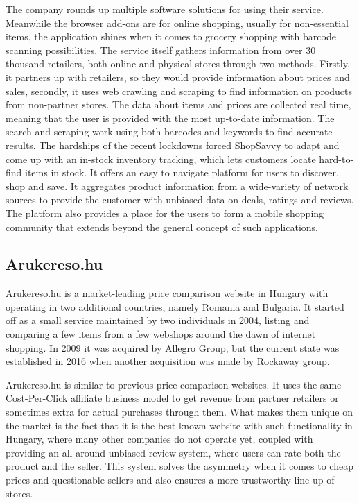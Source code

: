 The company rounds up multiple software solutions for using their service. Meanwhile the browser add-ons are for online shopping, usually for non-essential items, the application shines when it comes to grocery shopping with barcode scanning possibilities. The service itself gathers information from over 30 thousand retailers, both online and physical stores through two methods. Firstly, it partners up with retailers, so they would provide information about prices and sales, secondly, it uses web crawling and scraping to find information on products from non-partner stores. The data about items and prices are collected real time, meaning that the user is provided with the most up-to-date information. The search and scraping work using both barcodes and keywords to find accurate results. The hardships of the recent lockdowns forced ShopSavvy to adapt and come up with an in-stock inventory tracking, which lets customers locate hard-to-find items in stock. It offers an easy to navigate platform for users to discover, shop and save. It aggregates product information from a wide-variety of network sources to provide the customer with unbiased data on deals, ratings and reviews. The platform also provides a place for the users to form a mobile shopping community that extends beyond the general concept of such applications. \cite{shopsavvy2020}

\subsection{Arukereso.hu}

Arukereso.hu is a market-leading price comparison website in Hungary with operating in two additional countries, namely Romania and Bulgaria. It started off as a small service maintained by two individuals in 2004, listing and comparing a few items from a few webshops around the dawn of internet shopping. In 2009 it was acquired by Allegro Group, but the current state was established in 2016 when another acquisition was made by Rockaway group. \cite{arukeresoLinkedin}

Arukereso.hu is similar to previous price comparison websites. It uses the same Cost-Per-Click affiliate business model to get revenue from partner retailers or sometimes extra for actual purchases through them. What makes them unique on the market is the fact that it is the best-known website with such functionality in Hungary, where many other companies do not operate yet, coupled with providing an all-around unbiased review system, where users can rate both the product and the seller. This system solves the asymmetry when it comes to cheap prices and questionable sellers and also ensures a more trustworthy line-up of stores. \cite{karacsony2019}

